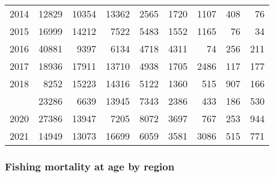 \documentclass[
]{article}
\begin{document}
\begin{longtable}[t]{lrrrrrrrr}
2014 & 12829 & 10354 & 13362 & 2565 & 1720 & 1107 & 408 & 76\\
2015 & 16999 & 14212 & 7522 & 5483 & 1552 & 1165 & 76 & 34\\
2016 & 40881 & 9397 & 6134 & 4718 & 4311 & 74 & 256 & 211\\
2017 & 18936 & 17911 & 13710 & 4938 & 1705 & 2486 & 117 & 177\\
2018 & 8252 & 15223 & 14316 & 5122 & 1360 & 515 & 907 & 166\\
\addlinespace
2019 & 23286 & 6639 & 13945 & 7343 & 2386 & 433 & 186 & 530\\
2020 & 27386 & 13947 & 7205 & 8072 & 3697 & 767 & 253 & 944\\
2021 & 14949 & 13073 & 16699 & 6059 & 3581 & 3086 & 515 & 771\\*
\end{longtable}

\hypertarget{fishing-mortality-at-age-by-region}{%
\subsubsection{Fishing mortality at age by
region}\label{fishing-mortality-at-age-by-region}}
\end{document}
